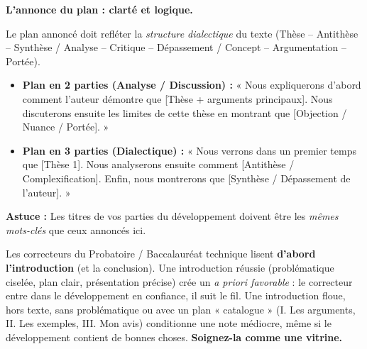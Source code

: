 \documentclass[11pt]{article}
\begin{document}
\textbf{L'annonce du plan : clarté et logique.}\par
Le plan annoncé doit refléter la \emph{structure dialectique} du texte (Thèse – Antithèse – Synthèse / Analyse – Critique – Dépassement / Concept – Argumentation – Portée).
\begin{aretenir}
\begin{itemize}
    \item \textbf{Plan en 2 parties (Analyse / Discussion) :} « Nous expliquerons d'abord comment l'auteur démontre que [Thèse + arguments principaux]. Nous discuterons ensuite les limites de cette thèse en montrant que [Objection / Nuance / Portée]. »
    \item \textbf{Plan en 3 parties (Dialectique) :} « Nous verrons dans un premier temps que [Thèse 1]. Nous analyserons ensuite comment [Antithèse / Complexification]. Enfin, nous montrerons que [Synthèse / Dépassement de l'auteur]. »
\end{itemize}
\textbf{Astuce :} Les titres de vos parties du développement doivent être les \emph{mêmes mots-clés} que ceux annoncés ici.
\end{aretenir}

\begin{savaistu}
Les correcteurs du Probatoire / Baccalauréat technique lisent \textbf{d'abord l'introduction} (et la conclusion). Une introduction réussie (problématique ciselée, plan clair, présentation précise) crée un \emph{a priori favorable} : le correcteur entre dans le développement en confiance, il suit le fil. Une introduction floue, hors texte, sans problématique ou avec un plan « catalogue » (I. Les arguments, II. Les exemples, III. Mon avis) conditionne une note médiocre, même si le développement contient de bonnes choses. \textbf{Soignez-la comme une vitrine.}
\end{savaistu}
\end{document}
